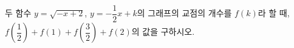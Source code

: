 \hspace*{2mm}\begin{minipage}[t]{\dimexpr\linewidth-2mm\relax}\vspace{0pt}
두 함수 $y=\sqrt{-x+2}$, $y=-\dfrac{1}{2}x+k$의 그래프의 교점의 개수를 $f(k)$라 할 때, $f\!\left(\dfrac{1}{2}\right)+f(1)+f\!\left(\dfrac{3}{2}\right)+f(2)$의 값을 구하시오.\end{minipage}
